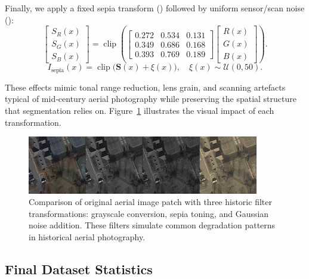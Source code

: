 Finally, we apply a fixed sepia transform () followed by uniform sensor/scan noise ():
\begin{equation}
\begin{bmatrix} S_R(x) \\ S_G(x) \\ S_B(x) \end{bmatrix}
= \operatorname{clip}\left(
\begin{bmatrix}
0.272 & 0.534 & 0.131 \\
0.349 & 0.686 & 0.168 \\
0.393 & 0.769 & 0.189
\end{bmatrix}
\begin{bmatrix} R(x) \\ G(x) \\ B(x) \end{bmatrix}
\right).
\label{eq:sepia}
\end{equation}
\begin{equation}
I_{\text{sepia}}(x) = \operatorname{clip}\big(\mathbf{S}(x) + \xi(x)\big),\quad \xi(x)\sim\mathcal{U}(0,50).
\label{eq:sepia_noise}
\end{equation}

These effects mimic tonal range reduction, lens grain, and scanning artefacts typical of mid‑century aerial photography while preserving the spatial structure that segmentation relies on. Figure~\ref{fig:historic_filters} illustrates the visual impact of each transformation.

\begin{figure}[t]
\centering
\includegraphics[width=0.9\textwidth]{./images/filters.png}
\caption{Comparison of original aerial image patch with three historic filter transformations: grayscale conversion, sepia toning, and Gaussian noise addition. These filters simulate common degradation patterns in historical aerial photography.}
\label{fig:historic_filters}
\end{figure}

\subsection{Final Dataset Statistics}

